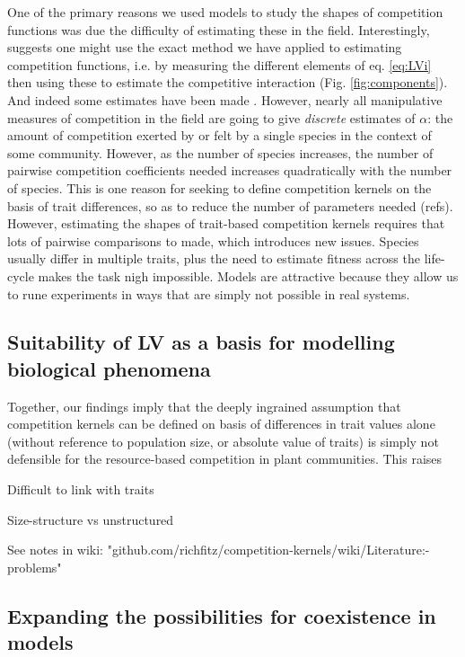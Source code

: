 \documentclass[a4paper,11pt]{article}
\begin{document}
One of the primary reasons we used models to study the shapes of competition
functions was due the difficulty of estimating these in the field.
Interestingly, \citet{Ricklefs-1973} suggests one might use the exact  method
we have applied to estimating competition functions, i.e. by measuring the
different elements of eq. \ref{eq:LVi} then using these to estimate the
competitive interaction (Fig. \ref{fig:components}). And indeed some
estimates have been made \citep{Ricklefs-1973}. However, nearly all
manipulative measures of competition in the field are going to give
\emph{discrete} estimates of $\alpha$: the amount of competition exerted by
or felt by a single species in the context of some community. However, as
the number of species increases, the number of pairwise competition
coefficients needed increases quadratically with the number of species. This is
one reason for seeking to define competition kernels on the basis of
trait differences, so as to reduce the number of parameters needed (refs).
However, estimating the shapes of trait-based competition kernels requires
that lots of pairwise comparisons to made, which introduces new issues.
Species usually differ in multiple traits, plus the need to estimate fitness
across the life-cycle makes the task nigh impossible. Models are attractive
because they allow us to rune experiments in ways that are simply not
possible in real systems. 

\subsection{Suitability of LV as a basis for modelling biological phenomena}

Together, our findings imply  that the deeply ingrained assumption that
competition kernels can be defined on basis of differences in trait values
alone (without reference to population size, or absolute value of traits)
is simply not defensible for the resource-based competition in plant
communities. This raises 


Difficult to link with traits

Size-structure vs unstructured

See notes in wiki:
"github.com/richfitz/competition-kernels/wiki/Literature:-problems"

\subsection{Expanding the possibilities for coexistence in models}
\end{document}
